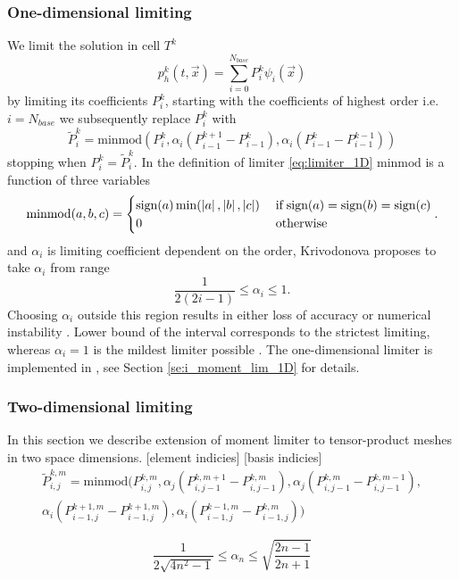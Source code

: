 \subsubsection{One-dimensional limiting}
\label{sse:moment_lim_1D}
We limit the solution in cell $T^k$
\begin{equation}
\label{eq:el_lin_comb_lim}
p_h^k(t, \vec{x}) = \sum\limits_{i=0}^{N_{base}} P_i^k\psi_i(\vec{x})
\end{equation}
by limiting its coefficients $P_i^k$, starting with the coefficients of 
highest order i.e. $i = N_{base}$ we subsequently replace 
$P_i^k$ with
\begin{equation}
\label{eq:limiter_1D}
	\tilde{P}_i^k = \text{minmod}\left(P_i^k, 
						\alpha_i(P_{i-1}^{k+1} - P_{i-1}^k), 
						\alpha_i (P_{i-1}^k - P_{i-1}^{k-1})\right)
\end{equation}
stopping when $P_i^k = \tilde{P}_i^k$. In the definition of limiter \eqref{eq:limiter_1D} 
$\text{minmod}$ is a function of three 
variables
\begin{equation}
	\text{minmod}(a,b,c) = 
	\begin{cases}
			\text{sign}(a)\min(\left\lvert a\right\rvert, \left\lvert b\right\rvert, \left\lvert c\right\rvert) & \;\text{if}\; 	
															\text{sign}(a) =
															\text{sign}(b) = 
															\text{sign}(c)\\
														0 & \;\text{otherwise}
	\end{cases}.
\end{equation}
and $\alpha_i$ is limiting coefficient dependent on the order, Krivodonova 
\cite{Krivodonova2007} proposes to take $\alpha_i$ from range
\begin{equation}
	\frac{1}{2(2i -1)} \leq \alpha_i \leq 1.
\end{equation}
Choosing $\alpha_i$ outside this region results in either loss of accuracy or numerical 
instability \cite[p. 882]{Krivodonova2007}. Lower bound of the interval corresponds to 
the strictest limiting, whereas $\alpha_i = 1$ is the mildest limiter possible \cite[p. 
882]{Krivodonova2007}. The one-dimensional limiter is implemented in 
, see Section \ref{se:i_moment_lim_1D} for details.

\subsubsection{Two-dimensional limiting}
In this section we describe extension of moment limiter to tensor-product meshes in two 
space dimensions.
[\todo element indicies]
[\todo basis indicies]
\begin{multline}
\tilde{P}^{k,m}_{i,j} =
	\text{minmod}\big(P^{k,m}_{i,j}, 
								 \alpha_j(P^{k,m+1}_{i,j-1} - P^{k,m}_{i,j-1}),
							     \alpha_j(P^{k,m}_{i,j-1} - P^{k,m-1}_{i,j-1}),\\
								 \alpha_i(P^{k+1,m}_{i-1,j} - P^{k+1,m}_{i-1,j}),
								 \alpha_i(P^{k-1,m}_{i-1,j} - P^{k,m}_{i-1,j})\big)
\end{multline}


\begin{equation}
	\frac{1}{2\sqrt{4n^2 - 1}} \leq \alpha_n \leq \sqrt{\frac{2n - 1}{2n + 1}}
\end{equation} 



